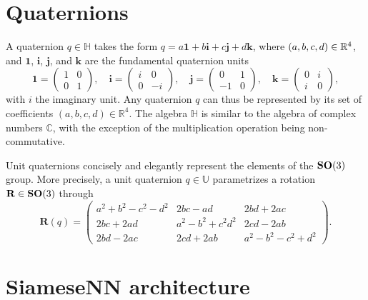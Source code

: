 \section{Quaternions}\label{sec:quaternions}

A quaternion $q\in\mathbb{H}$ takes the form
$q =  a\boldsymbol{1} + b\boldsymbol{i} + c\boldsymbol{j} + d\boldsymbol{k}$,
where $(a,b,c,d) \in \mathbb{R}^4$, and $\boldsymbol{1}$, $\boldsymbol{i}$, $\boldsymbol{j}$, and $\boldsymbol{k}$ are the fundamental quaternion units
\begin{equation*}
    \boldsymbol{1} = \begin{pmatrix} 1 & 0 \\ 0 & 1 \end{pmatrix}, \quad
    \boldsymbol{i} = \begin{pmatrix} i & 0 \\ 0 & -i \end{pmatrix}, \quad
    \boldsymbol{j} = \begin{pmatrix} 0 & 1 \\ -1 & 0 \end{pmatrix}, \quad
    \boldsymbol{k} = \begin{pmatrix} 0 & i \\ i & 0 \end{pmatrix},
\end{equation*}
with $i$ the imaginary unit.
Any quaternion $q$ can thus be represented by its set of coefficients $(a,b,c,d)\in\mathbb{R}^4$.
The algebra $\mathbb{H}$ is similar to the algebra of complex numbers $\mathbb{C}$, with the exception of the multiplication operation being non-commutative.

Unit quaternions concisely and elegantly represent the elements of the $\mathrm{\mathbf{SO}}(3)$ group.
More precisely, a unit quaternion $q\in\mathbb{U}$ parametrizes a rotation $\mathbf{R}\in\mathrm{\mathbf{SO}}(3)$ through
\begin{equation*}
    \mathbf{R}(q) = \begin{pmatrix}
    a^2+b^2-c^2-d^2 & 2bc-ad & 2bd+2ac \\
    2bc+2ad & a^2-b^2+c^2d^2 & 2cd-2ab \\
    2bd-2ac & 2cd+2ab & a^2-b^2-c^2+d^2
    \end{pmatrix}.
\end{equation*}

\newpage
\section{SiameseNN architecture}\label{sec:siamese-architecture}


